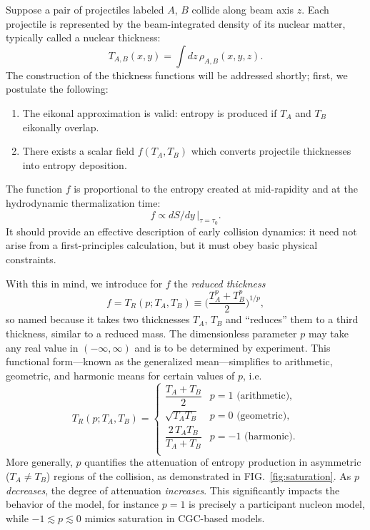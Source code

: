 \documentclass[aps,prc,reprint,amsmath,nofootinbib]{revtex4-1}
\begin{document}

Suppose a pair of projectiles labeled $A$, $B$ collide along beam axis $z$.  Each projectile is represented by
the beam-integrated density of its nuclear matter, typically called a nuclear thickness:
\begin{equation}
  T_{A,B}(x, y) = \int dz \, \rho_{A,B}(x, y, z).
\end{equation}
The construction of the thickness functions will be addressed shortly; first, we postulate the following:
\begin{enumerate}
  \item The eikonal approximation is valid:  entropy is produced if $T_A$ and $T_B$ eikonally overlap.
  \item There exists a scalar field $f(T_A, T_B)$ which converts projectile thicknesses into entropy
    deposition.
\end{enumerate}
The function $f$ is proportional to the entropy created at mid-rapidity and at the hydrodynamic thermalization
time:
\begin{equation}
  f \propto dS/dy \, |_{\tau = \tau_0}.
\end{equation}
It should provide an effective description of early collision dynamics:  it need not arise from a
first-principles calculation, but it must obey basic physical constraints.

With this in mind, we introduce for $f$ the \emph{reduced thickness}
\begin{equation}
  f = T_R(p; T_A, T_B) \equiv \biggl( \frac{T_A^p + T_B^p}{2} \biggr)^{1/p},
  \label{eq:tr}
\end{equation}
so named because it takes two thicknesses $T_A$, $T_B$ and ``reduces'' them to a third thickness, similar to a
reduced mass.  The dimensionless parameter $p$ may take any real value in $(-\infty, \infty)$ and is to be
determined by experiment.  This functional form---known as the generalized mean---simplifies to arithmetic,
geometric, and harmonic means for certain values of $p$, i.e.
\begin{equation}
  T_R(p; T_A, T_B) =
  \begin{cases}
    \dfrac{T_A + T_B}{2} & p = 1 \text{ (arithmetic)}, \\[2ex]
    \sqrt{T_A T_B} & p = 0 \text{ (geometric)}, \\[2ex]
    \dfrac{2\, T_A T_B}{T_A + T_B} & p = -1 \text{ (harmonic)}. \\
  \end{cases}
\end{equation}
More generally, $p$ quantifies the attenuation of entropy production in asymmetric ($T_A \neq T_B$) regions of
the collision, as demonstrated in FIG.~\ref{fig:saturation}.  As $p$ \emph{decreases}, the degree of
attenuation \emph{increases}.  This significantly impacts the behavior of the model, for instance $p=1$ is
precisely a participant nucleon model, while $-1 \lesssim p \lesssim 0$ mimics saturation in CGC-based models.
\end{document}
